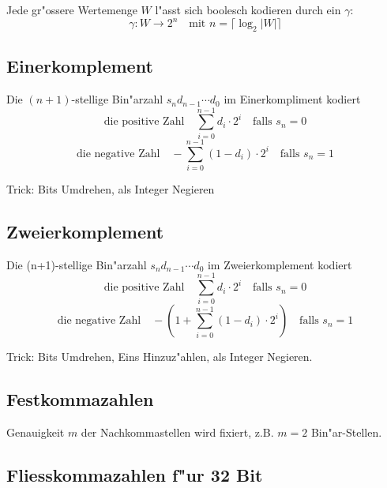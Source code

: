 \documentclass[german, 10pt, a4paper, twocolumn]{scrartcl}
\theoremstyle{definition}
\begin{document}
Jede gr"ossere Wertemenge $W$ l"asst sich boolesch kodieren durch ein $\gamma$:
\begin{displaymath}
	\gamma : W \rightarrow 2^n \quad \mbox{mit } n=\lceil \log_2 |W| \rceil
\end{displaymath}

\subsection{Einerkomplement}

Die $(n+1)$-stellige Bin"arzahl $s_nd_{n-1}\cdots d_0$ im Einerkompliment kodiert
\begin{displaymath}
	\mbox{die positive Zahl} \quad \sum^{n-1}_{i=0} d_i \cdotp 2^i \quad \mbox{falls } s_n=0
\end{displaymath}
\begin{displaymath}
	\mbox{die negative Zahl} \quad -\sum^{n-1}_{i=0} (1-d_i) \cdotp 2^i \quad \mbox{falls } s_n=1
\end{displaymath}

Trick: Bits Umdrehen, als Integer Negieren

\subsection{Zweierkomplement}

Die (n+1)-stellige Bin"arzahl $s_n d_{n-1}\cdots d_0$ im Zweierkomplement kodiert
\begin{displaymath}
	\mbox{die positive Zahl} \quad \sum^{n-1}_{i=0} d_i \cdotp 2^i \quad \mbox{falls } s_n=0
\end{displaymath}
\begin{displaymath}
	\mbox{die negative Zahl} \quad -(1+\sum^{n-1}_{i=0} (1-d_i) \cdotp 2^i) \quad \mbox{falls } s_n=1
\end{displaymath}

Trick: Bits Umdrehen, Eins Hinzuz"ahlen, als Integer Negieren.

\subsection{Festkommazahlen}

Genauigkeit $m$ der Nachkommastellen wird fixiert, z.B. $m=2$ Bin"ar-Stellen.

\subsection{Fliesskommazahlen f"ur 32 Bit}
\end{document}
